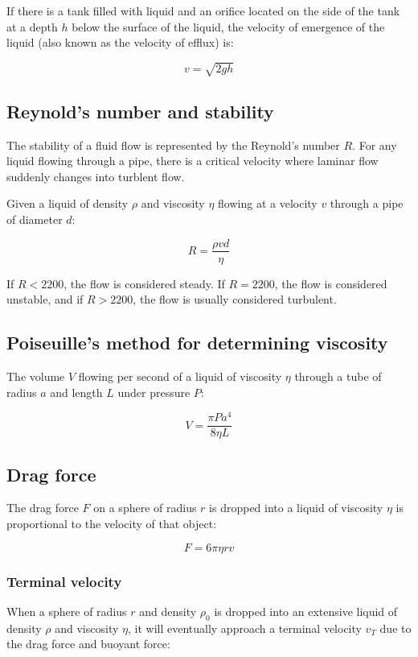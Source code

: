 \documentclass[12pt]{article}
\begin{document}
If there is a tank filled with liquid and an orifice located on the side of the tank at a depth $h$ below the surface of the liquid, the velocity of emergence of the liquid (also known as the velocity of efflux) is:

\[
\boxed{
v = \sqrt{2gh}
}
\]

\subsection{Reynold's number and stability}

The stability of a fluid flow is represented by the Reynold's number $R$.
For any liquid flowing through a pipe, there is a critical velocity where laminar flow suddenly changes into turblent flow.

Given a liquid of density $\rho$ and viscosity $\eta$ flowing at a velocity $v$ through a pipe of diameter $d$:

\[
\boxed{
R = \frac{\rho v d}{\eta}
}
\]

If $R < 2200$, the flow is considered steady. If $R = 2200$, the flow is considered unstable, and if $R > 2200$, the flow is usually considered turbulent.

\subsection{Poiseuille's method for determining viscosity}

The volume $V$ flowing per second of a liquid of viscosity $\eta$ through a tube of radius $a$ and length $L$ under pressure $P$:

\[
\boxed{
V = \frac{\pi P a^4}{8\eta L}
}
\]

\subsection{Drag force}

The drag force $F$ on a sphere of radius $r$ is dropped into a liquid of viscosity $\eta$ is proportional to the velocity of that object:

\[
\boxed{
F = 6 \pi \eta r v
}
\]

\subsubsection{Terminal velocity}

When a sphere of radius $r$ and density $\rho_0$ is dropped into an extensive liquid of density $\rho$ and viscosity $\eta$, it will eventually approach a terminal velocity $v_T$ due to the drag force and buoyant force:
\end{document}
